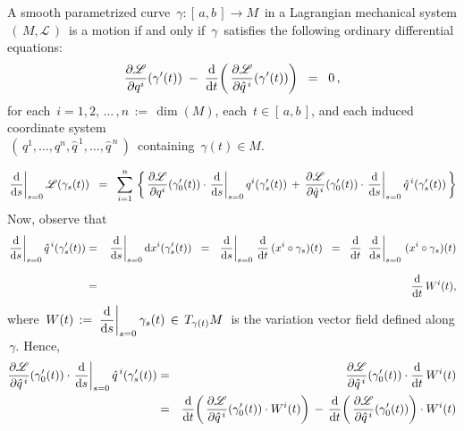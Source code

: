 \vskip 0.5cm
\begin{proposition}
\label{EulerLagrangeEquations}
\mbox{}
\vskip 0.1cm
\noindent
A smooth parametrized curve
\,$\gamma : [\,a,b\,] \longrightarrow M$\,
in a Lagrangian mechanical system
\,$\left(\,M,\mathscr{L}\,\right)$\,
is a motion if and only if
\,$\gamma$\,
satisfies the following ordinary differential equations:
\begin{equation*}
\dfrac{\partial\mathscr{L}}{\partial q^{i}}\!\left(\gamma^{\prime}(t)\right)
\; - \;
\dfrac{\textnormal{d}}{\textnormal{d} t}\!\left(\,\dfrac{\partial\mathscr{L}}{\partial \hat{q}^{\,i}}\!\left(\gamma^{\prime}(t)\right)\right)
\;\; = \;\;
0\,,
\end{equation*}
for each \,$i = 1, 2, \,\ldots\, , n \,:=\, \dim(M)$,
each \,$t \in [\,a,b\,]$, and
each induced coordinate system\\
\,$\left(\,q^{1},\ldots,q^{n},\hat{q}^{\,1},\ldots,\hat{q}^{\,n}\,\right)$\,
containing \,$\gamma(t) \in M$.
\end{proposition}
\proof
\begin{equation}\label{VariationVectorField}
\left.\dfrac{\textnormal{d}}{\textnormal{d} s}\right\vert_{s=0} \mathscr{L}\!\left(\gamma_{s}(t)\right)
\;\; = \;\;
	\overset{n}{\underset{i=1}{\sum}}\,\left\{\,
		\dfrac{\partial\mathscr{L}}{\partial q^{i}}\!\left(\gamma^{\prime}_{0}(t)\right)
		\cdot
		\left.\dfrac{\textnormal{d}}{\textnormal{d} s}\right\vert_{s=0} q^{i}(\gamma^{\prime}_{s}(t))
		\, + \,
		\dfrac{\partial\mathscr{L}}{\partial\hat{q}^{\,i}}\!\left(\gamma^{\prime}_{0}(t)\right)
		\cdot
		\left.\dfrac{\textnormal{d}}{\textnormal{d} s}\right\vert_{s=0} \hat{q}^{\,i}(\gamma^{\prime}_{s}(t))
		\,\right\}
\end{equation}
Now, observe that
\begin{eqnarray*}
\left.\dfrac{\d}{\d s}\right\vert_{s=0} \hat{q}^{\,i}(\gamma^{\prime}_{s}(t))
& = &
	\left.\dfrac{\d}{\d s}\right\vert_{s=0} \d x^{i}(\gamma^{\prime}_{s}(t))
\;\; = \;\;
	\left.\dfrac{\d}{\d s}\right\vert_{s=0} \, \dfrac{\d}{\d t}\,(x^{i}\circ\gamma_{s})(t)
\;\; = \;\;
	\dfrac{\d}{\d t}\; \left.\dfrac{\d}{\d s}\right\vert_{s=0} \, (x^{i}\circ\gamma_{s})(t)
\\
& = &
	\overset{{\color{white}1}}{\dfrac{\d}{\d t}}\, W^{i}(t),
\end{eqnarray*}
where
\,$W(t) \,:=\, \left.\dfrac{\textnormal{d}}{\textnormal{d} s}\right\vert_{s=0} \gamma_{s}(t) \,\in\, T_{\gamma(t)}M$\,
is the variation vector field defined along \,$\gamma$.
Hence,
\begin{eqnarray*}
\dfrac{\partial\mathscr{L}}{\partial\hat{q}^{\,i}}\!\left(\gamma^{\prime}_{0}(t)\right)
\cdot
\left.\dfrac{\textnormal{d}}{\textnormal{d} s}\right\vert_{s=0} \hat{q}^{\,i}(\gamma^{\prime}_{s}(t))
& = &
	\dfrac{\partial\mathscr{L}}{\partial\hat{q}^{\,i}}\!\left(\gamma^{\prime}_{0}(t)\right)
	\cdot
	\dfrac{\textnormal{d}}{\textnormal{d} t}\, W^{i}(t)	
\\
& = &
	\dfrac{\textnormal{d}}{\textnormal{d} t}\!\left(\,
		\dfrac{\partial\mathscr{L}}{\partial\hat{q}^{\,i}}\!\left(\gamma^{\prime}_{0}(t)\right)
		\cdot
		W^{i}(t)
		\right)
	\, - \,
	\dfrac{\textnormal{d}}{\textnormal{d} t}\!\left(\,
		\dfrac{\partial\mathscr{L}}{\partial\hat{q}^{\,i}}\!\left(\gamma^{\prime}_{0}(t)\right)
		\right)	
	\cdot
	W^{i}(t)
\end{eqnarray*}
